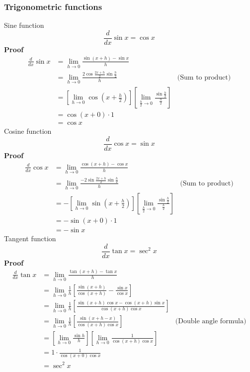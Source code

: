 \documentclass{article}
\begin{document}
\subsubsection{Trigonometric functions}
Sine function
\begin{equation*}
    \frac{d}{dx}\sin x=\cos x    
\end{equation*}
\textbf{Proof}
\begin{equation*}
\begin{aligned}
    \frac{d}{dx}\sin x & =\lim _{h\rightarrow 0}\frac{\sin( x+h) -\sin x}{h} & \\
     & =\lim _{h\rightarrow 0}\frac{2\cos\frac{2x+h}{2}\sin\frac{h}{2}}{h} & \text{(Sum to product)}\\
     & =\left[\lim _{h\rightarrow 0}\cos\left( x+\frac{h}{2}\right)\right]\left[\lim _{\frac{h}{2}\rightarrow 0}\frac{\sin\frac{h}{2}}{\frac{h}{2}}\right] & \\
     & =\cos( x+0) \cdot 1 & \\
     & =\cos x & 
\end{aligned}
\end{equation*}
Cosine function
\begin{equation*}
    \frac{d}{dx}\cos x=\sin x    
\end{equation*}
\textbf{Proof}
\begin{equation*}
\begin{aligned}
    \frac{d}{dx}\cos x & =\lim _{h\rightarrow 0}\frac{\cos( x+h) -\cos x}{h} & \\
     & =\lim _{h\rightarrow 0}\frac{-2\sin\frac{2x+h}{2}\sin\frac{h}{2}}{h} & \text{(Sum to product)}\\
     & =-\left[\lim _{h\rightarrow 0}\sin\left( x+\frac{h}{2}\right)\right]\left[\lim _{\frac{h}{2}\rightarrow 0}\frac{\sin\frac{h}{2}}{\frac{h}{2}}\right] & \\
     & =-\sin( x+0) \cdot 1 & \\
     & =-\sin x & 
\end{aligned}
\end{equation*}
Tangent function
\begin{equation*}
    \frac{d}{dx}\tan x=\sec^{2} x
\end{equation*}
\textbf{Proof}
\begin{equation*}
\begin{aligned}
    \frac{d}{dx}\tan x & =\lim _{h\rightarrow 0}\frac{\tan( x+h) -\tan x}{h} & \\
    & =\lim _{h\rightarrow 0}\frac{1}{h}\left[\frac{\sin( x+h)}{\cos( x+h)} -\frac{\sin x}{\cos x}\right] & \\
    & =\lim _{h\rightarrow 0}\frac{1}{h}\left[\frac{\sin( x+h)\cos x-\cos( x+h)\sin x}{\cos( x+h)\cos x}\right] & \\
    & =\lim _{h\rightarrow 0}\frac{1}{h}\left[\frac{\sin( x+h-x)}{\cos( x+h)\cos x}\right] & \text{(Double angle formula)}\\
    & =\left[\lim _{h\rightarrow 0}\frac{\sin h}{h}\right]\left[\lim _{h\rightarrow 0}\frac{1}{\cos( x+h)\cos x}\right] & \\
    & =1\cdot \frac{1}{\cos( x+0)\cos x} & \\
    & =\sec^{2} x & 
\end{aligned}
\end{equation*}
\end{document}
